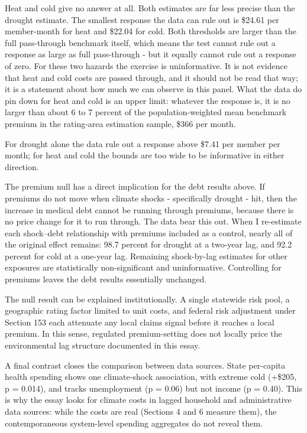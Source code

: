 \documentclass[a4paper,11pt]{article}
\begin{document}
Heat and cold give no answer at all. Both estimates are far less precise than the drought estimate. The smallest response the data can rule out is \$24.61 per member-month for heat and \$22.04 for cold. Both thresholds are larger than the full pass-through benchmark itself, which means the test cannot rule out a response as large as full pass-through - but it equally cannot rule out a response of zero. For these two hazards the exercise is uninformative. It is not evidence that heat and cold costs are passed through, and it should not be read that way; it is a statement about how much we can observe in this panel. What the data do pin down for heat and cold is an upper limit: whatever the response is, it is no larger than about 6 to 7 percent of the population-weighted mean benchmark premium in the rating-area estimation sample, \$366 per month.

For drought alone the data rule out a response above \$7.41 per member per month; for heat and cold the bounds are too wide to be informative in either direction.

The premium null has a direct implication for the debt results above. If premiums do not move when climate shocks - specifically drought - hit, then the increase in medical debt cannot be running through premiums, because there is no price change for it to run through. The data bear this out. When I re-estimate each shock--debt relationship with premiums included as a control, nearly all of the original effect remains: 98.7 percent for drought at a two-year lag, and 92.2 percent for cold at a one-year lag. Remaining shock-by-lag estimates for other exposures are statistically non-significant and uninformative. Controlling for premiums leaves the debt results essentially unchanged.

The null result can be explained institutionally. A single statewide risk pool, a geographic rating factor limited to unit costs, and federal risk adjustment under Section 153 each attenuate any local claims signal before it reaches a local premium. \citep{kautter2014hhshcc} In this sense, regulated premium-setting does not locally price the environmental lag structure documented in this essay.

A final contrast closes the comparison between data sources. State per-capita health spending shows one climate-shock association, with extreme cold (+\$205, p = 0.014), and tracks unemployment (p = 0.06) but not income (p = 0.40). This is why the essay looks for climate costs in lagged household and administrative data sources: while the costs are real (Sections 4 and 6 measure them),  the contemporaneous system-level spending aggregates do not reveal them.
\end{document}
